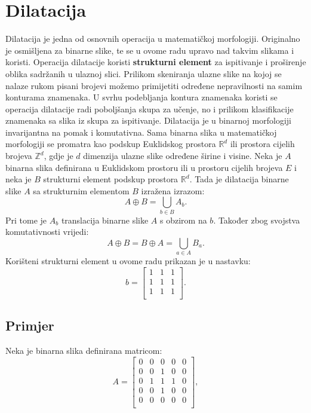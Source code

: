 \documentclass[times, utf8, diplomski]{fer}
\theoremstyle{definition}
\begin{document}
\section{Dilatacija}
Dilatacija je jedna od osnovnih operacija u matematičkoj morfologiji. Originalno je osmišljena za binarne slike, te se u ovome radu upravo nad takvim slikama i koristi. Operacija dilatacije koristi \textbf{strukturni element} za ispitivanje i proširenje oblika sadržanih u ulaznoj slici. Prilikom skeniranja ulazne slike na kojoj se nalaze rukom pisani brojevi možemo primijetiti određene nepravilnosti na samim konturama znamenaka. U svrhu podebljanja kontura znamenaka koristi se operacija dilatacije radi poboljšanja skupa za učenje, no i prilikom klasifikacije znamenaka sa slika iz skupa za ispitivanje. \newline
Dilatacija je u binarnoj morfologiji invarijantna na pomak i komutativna. Sama binarna slika u matematičkoj morfologiji se promatra kao podskup Euklidskog prostora ${\mathbb{R}^d}$ ili prostora cijelih brojeva $\mathbb{Z}^d$, gdje je $d$ dimenzija ulazne slike određene širine i visine. Neka je $A$ binarna slika definirana u Euklidskom prostoru ili u prostoru cijelih brojeva $E$ i neka je $B$ strukturni element podskup prostora ${\mathbb{R}^d}$. Tada je dilatacija binarne slike $A$ sa strukturnim elementom $B$ izražena izrazom:
\begin{equation}
A \oplus B = \bigcup_{b \in B} A_b.
\end{equation}
Pri tome je $A_b$ translacija binarne slike $A$ s obzirom na $b$. Također zbog svojstva komutativnosti vrijedi:
\begin{equation}
A \oplus B = B \oplus A = \bigcup_{a \in A} B_a.
\end{equation}
Korišteni strukturni element u ovome radu prikazan je u nastavku:
\[
b=
\begin{bmatrix}
1 & 1 & 1 \\
1 & 1 & 1 \\
1 & 1 & 1 \\
\end{bmatrix}.
\]
\subsection{Primjer}
Neka je binarna slika definirana matricom:
\[
A=
\begin{bmatrix}
0 & 0 & 0 & 0 & 0 \\
0 & 0 & 1 & 0 & 0 \\
0 & 1 & 1 & 1 & 0 \\
0 & 0 & 1 & 0 & 0 \\
0 & 0 & 0 & 0 & 0 \\

\end{bmatrix},
\]
\end{document}
